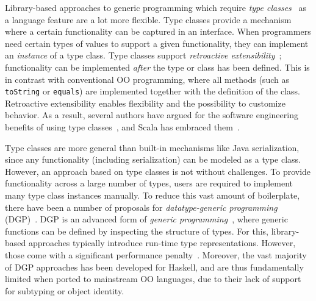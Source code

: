 \documentclass[preprint,nocopyrightspace]{sigplanconf}
\begin{document}
Library-based approaches to generic programming which require \emph{type
classes}~\cite{WadlerTypeClasses} as a language feature are a lot more
flexible.
Type classes provide a mechanism where a certain functionality can be captured in an interface.
When programmers need certain types of values to support a given
functionality, they can implement an \emph{instance} of a type class.
Type classes support \emph{retroactive
extensibility}~\cite{RetroactiveExtensibility}; functionality can be
implemented \emph{after} the type or class has been defined. This is in
contrast with conventional OO programming, where all methods (such as
\lstinline{toString} or \lstinline{equals}) are implemented together with the
definition of the class. Retroactive extensibility enables flexibility and the
possibility to customize behavior. As a result, several authors have argued
for the software engineering benefits of using type
classes~\cite{RetroactiveExtensibility,Oliveira2010}, and Scala has embraced
them~\cite{Oliveira2010,ScalaCollections,Pickling}.

Type classes are more general than built-in mechanisms like Java
serialization, since any functionality (including serialization) can be
modeled as a type class.
However, an approach based on type classes is not without challenges. To
provide functionality across a large number of types, users are
required to implement many type class instances manually. To reduce this vast amount of
boilerplate, there have been a number of proposals for \emph{datatype-generic
programming} (DGP)~\cite{ComparingGPHaskellRodriquez, ComparingGPHaskellHinze}.
DGP is an advanced form of \emph{generic programming}~\cite{GP}, where generic
functions can be defined by inspecting the structure of types. For this,
library-based approaches typically introduce run-time type representations.
However, those come with a significant performance
penalty~\cite{TemplateYourBoilerplate}. Moreover, the vast majority of DGP approaches
has been developed for Haskell, and are thus fundamentally limited when ported to
mainstream OO languages, due to their lack of support for subtyping or object identity.

\end{document}
